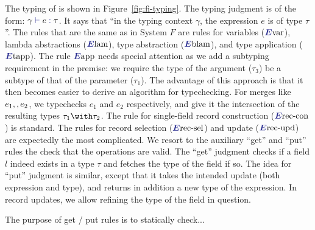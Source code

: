 The typing of \name is shown in Figure~\ref{fig:fi-typing}. The typing judgment
is of the form: $ \judgee \gamma e \tau $. It says that ``in the typing context
$\gamma$, the expression $e$ is of type $\tau$''. The rules that are the same as
in System $F$ are rules for variables ($\rulelabelevar$), lambda abstractions
($\rulelabelelam$), type abstraction ($\rulelabeleblam$), and type application
($\rulelabeletapp$). The rule $\rulelabeleapp$ needs special attention as we add
a subtyping requirement in the premise: we require the type of the argument
($\tau_3$) be a subtype of that of the parameter ($\tau_1$). The advantage of
this approach is that it then becomes easier to derive an algorithm for
typechecking. For merges like $e_1 ,, e_2$, we typechecks $e_1$ and $e_2$
respectively, and give it the intersection of the resulting types
$\tau_1 \andop \tau_2$. The rule for single-field record construction
($\rulelabelereccon$) is standard. The rules for record selection
($\rulelabelerecsel$) and update ($\rulelabelerecupd$) are expectedly the most
complicated. We resort to the auxiliary ``get'' and ``put'' rules the check that
the operations are valid. The ``get'' judgment checks if a field $ l $ indeed
exists in a type $ \tau $ and fetches the type of the field if so. The idea for
``put'' judgment is similar, except that it takes the intended update (both
expression and type), and returns in addition a new type of the expression. In
record updates, we allow refining the type of the field in question.

The purpose of get / put rules is to statically check...




